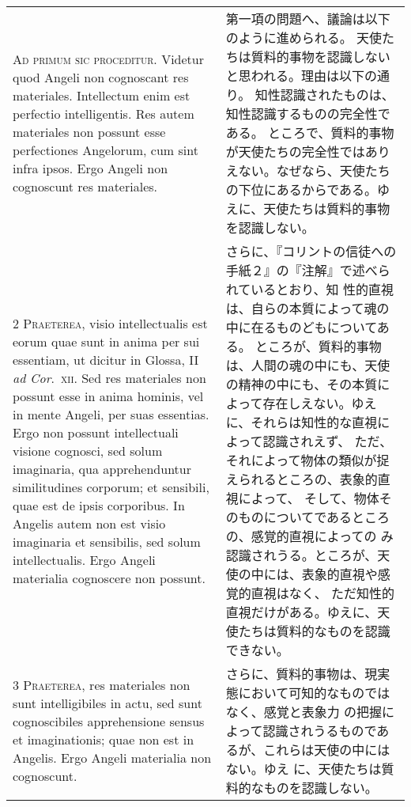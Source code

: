 \documentclass[10pt]{jsarticle} %
\begin{document}
\begin{longtable}{p{21em}p{21em}}


{\huge A}{\scshape d primum sic proceditur}. Videtur quod
Angeli non cognoscant res materiales. Intellectum enim est perfectio
intelligentis. Res autem materiales non possunt esse perfectiones
Angelorum, cum sint infra ipsos. Ergo Angeli non cognoscunt res
materiales.

&

第一項の問題へ、議論は以下のように進められる。
天使たちは質料的事物を認識しないと思われる。理由は以下の通り。
知性認識されたものは、知性認識するものの完全性である。
ところで、質料的事物が天使たちの完全性ではありえない。なぜなら、天使たち
 の下位にあるからである。ゆえに、天使たちは質料的事物を認識しない。

\\


{\scshape 2 Praeterea}, visio intellectualis est eorum
quae sunt in anima per sui essentiam, ut dicitur in Glossa, II {\itshape ad
Cor}.~{\scshape xii}. Sed res materiales non possunt esse in anima hominis, vel in
mente Angeli, per suas essentias. Ergo non possunt intellectuali visione
cognosci, sed solum imaginaria, qua apprehenduntur similitudines
corporum; et sensibili, quae est de ipsis corporibus. In Angelis autem
non est visio imaginaria et sensibilis, sed solum intellectualis. Ergo
Angeli materialia cognoscere non possunt.


&


さらに、『コリントの信徒への手紙２』の『注解』で述べられているとおり、知
 性的直視は、自らの本質によって魂の中に在るものどもについてある。
ところが、質料的事物は、人間の魂の中にも、天使の精神の中にも、その本質に
 よって存在しえない。ゆえに、それらは知性的な直視によって認識されえず、
 ただ、それによって物体の類似が捉えられるところの、表象的直視によって、
 そして、物体そのものについてであるところの、感覚的直視によっての
 み認識されうる。ところが、天使の中には、表象的直視や感覚的直視はなく、
 ただ知性的直視だけがある。ゆえに、天使たちは質料的なものを認識できない。

\\


{\scshape 3 Praeterea}, res materiales non sunt
intelligibiles in actu, sed sunt cognoscibiles apprehensione sensus et
imaginationis; quae non est in Angelis. Ergo Angeli materialia non
cognoscunt.


&

さらに、質料的事物は、現実態において可知的なものではなく、感覚と表象力
 の把握によって認識されうるものであるが、これらは天使の中にはない。ゆえ
 に、天使たちは質料的なものを認識しない。


\end{longtable}
\end{document}
